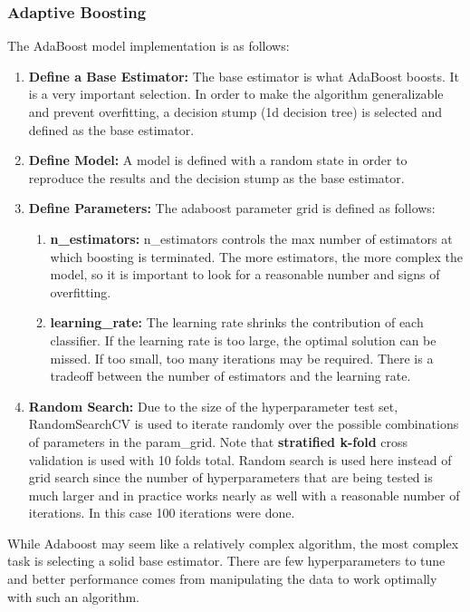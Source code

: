 \documentclass[11pt]{article}
\begin{document}
	\subsubsection{Adaptive Boosting}
		The AdaBoost model implementation is as follows:
		\begin{enumerate}
			\item \textbf{Define a Base Estimator:} The base estimator is what AdaBoost boosts. It is a very important selection. In order to make the algorithm generalizable and prevent overfitting, a decision stump (1d decision tree) is selected and defined as the base estimator.
			\item \textbf{Define Model:} A model is defined with a random state in order to reproduce the results and the decision stump as the base estimator.
			\item \textbf{Define Parameters:} The adaboost parameter grid is defined as follows: 
			\begin{enumerate}
				\item  \textbf{n\_estimators:} n\_estimators controls the max number of estimators at which boosting is terminated. The more estimators, the more complex the model, so it is important to look for a reasonable number and signs of overfitting.
				\item \textbf{learning\_rate:} The learning rate shrinks the contribution of each classifier. If the learning rate is too large, the optimal solution can be missed. If too small, too many iterations may be required. There is a tradeoff between the number of estimators and the learning rate.
			\end{enumerate}
			\item \textbf{Random Search:} Due to the size of the hyperparameter test set, RandomSearchCV is used to iterate randomly over the possible combinations of parameters in the param\_grid. Note that \textbf{stratified k-fold} cross validation is used with 10 folds total. Random search is used here instead of grid search since the number of hyperparameters that are being tested is much larger and in practice works nearly as well with a reasonable number of iterations. In this case 100 iterations were done.
		\end{enumerate}	
	
	While Adaboost may seem like a relatively complex algorithm, the most complex task is selecting a solid base estimator. There are few hyperparameters to tune and better performance comes from manipulating the data to work optimally with such an algorithm.
	
\end{document}
